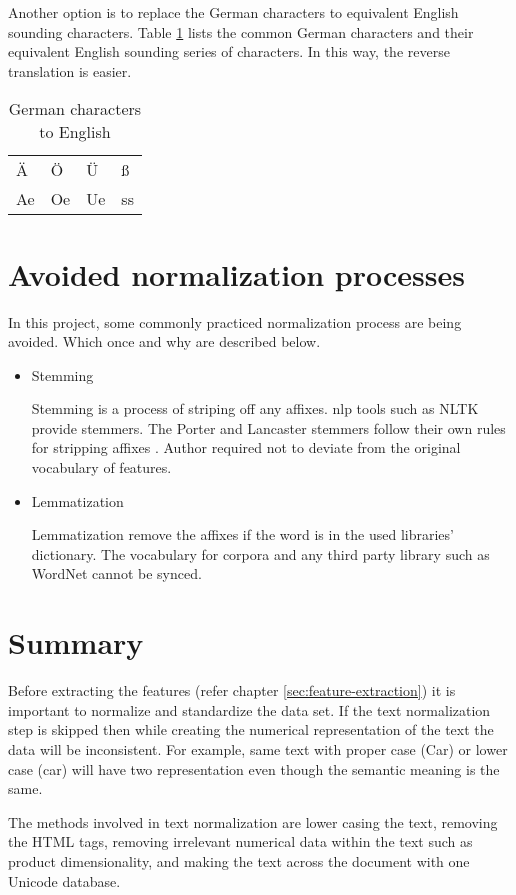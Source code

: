 Another option is to replace the German characters to equivalent English sounding characters. Table \ref{table:deu-eng} lists the common German characters and their equivalent English sounding series of characters. In this way, the reverse translation is easier.
\begin{table}[h]
      \centering
      \caption{German characters to English}
      \label{table:deu-eng}
      \begin{tabular}{ llll }
            \toprule
            \"A& Ö&  Ü&ß \\
            Ae&Oe & Ue&ss\\         
          
            \bottomrule
            \end{tabular}
  \end{table}


  \section{Avoided normalization processes}

  In this project, some commonly practiced normalization process are being avoided. Which once and why are described below.

  \begin{itemize}
      \item Stemming 
      
      Stemming is a process of striping off any affixes. \acl{nlp} tools such as NLTK provide stemmers. The Porter and Lancaster
      stemmers follow their own rules for stripping affixes \parencite{BirdKleinLoper09}. Author required not to deviate from the original vocabulary of features.

      \item Lemmatization
      
      Lemmatization remove the affixes if the word is in the used libraries' dictionary. The vocabulary for corpora and any third party library such as WordNet cannot be synced.   

  \end{itemize}

\section{Summary}

Before extracting the features (refer chapter \ref{sec:feature-extraction}) it is important to normalize and standardize the data set. If the text normalization step is skipped then while creating the numerical representation of the text the data will be inconsistent. For example, same text with proper case (Car) or lower case (car) will have two representation even though the semantic meaning is the same.  

The methods involved in text normalization are lower casing the text, removing the HTML tags, removing irrelevant numerical data within the text such as product dimensionality, and making the text across the document with one Unicode database.
